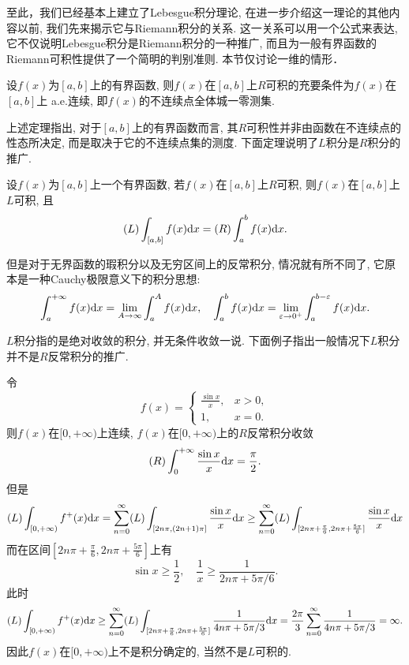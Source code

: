 至此，我们已经基本上建立了Lebesgue积分理论, 在进一步介绍这一理论的其他内容以前, 我们先来揭示它与Riemann积分的关系. 
这一关系可以用一个公式来表达, 它不仅说明Lebesgue积分是Riemann积分的一种推广, 而且为一般有界函数的Riemann可积性提供了一个简明的判别准则. 
本节仅讨论一维的情形．



\begin{theorem}
	设$f(x)$为$[a,b]$上的有界函数, 则$f(x)$在$[a,b]$上$R$可积的充要条件为$f(x)$在$[a,b]$上 a.e.连续, 即$f(x)$的不连续点全体城一零测集. 
\end{theorem}

上述定理指出, 对于$[a,b]$上的有界函数而言, 其$R$可积性并非由函数在不连续点的性态所决定, 而是取决于它的不连续点集的测度. 
下面定理说明了$L$积分是$R$积分的推广.
\begin{theorem}
	设$f(x)$为$[a,b]$上一个有界函数, 若$f(x)$在$[a,b]$上$R$可积, 则$f(x)$在$[a,b]$上$L$可积, 且
	$$
		(L) \int_{[a,b]} f(x) \mathrm{d} x = (R) \int_a^b f(x) \mathrm{d} x.
	$$
\end{theorem}

但是对于无界函数的瑕积分以及无穷区间上的反常积分, 情况就有所不同了, 它原本是一种Cauchy极限意义下的积分思想:
$$
	\int_a^{+\infty} f(x) \mathrm{d} x = \lim\limits_{A \to \infty} \int_a^A f(x) \mathrm{d} x, \quad
	\int_a^b f(x) \mathrm{d} x = \lim\limits_{\varepsilon \to 0^+} \int_a^{b-\varepsilon} f(x) \mathrm{d} x.
$$

$L$积分指的是绝对收敛的积分, 并无条件收敛一说.
下面例子指出一般情况下$L$积分并不是$R$反常积分的推广.
\begin{example}
	令
	$$
		f(x) = 
		\begin{cases}
			\frac{\sin x}{x}, & x>0 , \\
			1, & x=0 .
		\end{cases}
	$$
	则$f(x)$在$[0, +\infty)$上连续, $f(x)$在$[0, +\infty)$上的$R$反常积分收敛
	$$
		(R) \int_0^{+\infty} \frac{\sin x}{x} \mathrm{d} x = \frac{\pi}{2}.
	$$
	但是
	$$
		(L) \int_{[0,+\infty)} f^+(x) \mathrm{d} x
		= \sum\limits_{n=0}^{\infty} (L) \int_{[2n\pi, (2n+1)\pi]} \frac{\sin x}{x} \mathrm{d} x
		\geq \sum\limits_{n=0}^{\infty} (L) \int_{[2n\pi+\frac{\pi}6, 2n\pi+\frac{5\pi}6]} \frac{\sin x}{x} \mathrm{d} x
	$$
	而在区间$[2n\pi+\frac{\pi}6, 2n\pi+\frac{5\pi}6]$上有
	$$
			\sin x \geq \frac{1}{2}, \quad
			\frac{1}{x} \geq \frac{1}{2n\pi+5\pi / 6}. 
	$$
	此时
	$$
		(L) \int_{[0,+\infty)} f^+(x) \mathrm{d} x 
		\geq \sum\limits_{n=0}^{\infty} (L) \int_{[2n\pi+\frac{\pi}6, 2n\pi+\frac{5\pi}6]} \frac{1}{4n\pi+5\pi / 3} \mathrm{d} x
		= \frac{2\pi}{3} \sum\limits_{n=0}^{\infty} \frac{1}{4n\pi+5\pi / 3} 
		= \infty.
	$$
	因此$f(x)$在$[0, +\infty)$上不是积分确定的, 当然不是$L$可积的.
\end{example}


